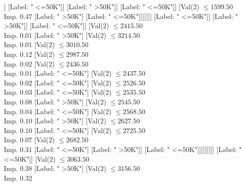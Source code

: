 \documentclass[margin=10pt]{standalone}
\begin{document}
\begin{forest}
																														[Label: " >50K"]]
																													[Label: " <=50K"]]
																												[Label: " >50K"]]
																											[Label: " <=50K"]]
																										[Val($2$) $ \leq 1599.50$ \\ Imp. $0.47$
																											[Label: " >50K"]
																											[Label: " <=50K"]]]]]]]
																					[Label: " <=50K"]]
																				[Label: " >50K"]]
																			[Label: " <=50K"]]
																		[Val($2$) $ \leq 2415.50$ \\ Imp. $0.01$
																			[Label: " >50K"]
																			[Val($2$) $ \leq 3214.50$ \\ Imp. $0.01$
																				[Val($2$) $ \leq 3010.50$ \\ Imp. $0.12$
																					[Val($2$) $ \leq 2987.50$ \\ Imp. $0.02$
																						[Val($2$) $ \leq 2436.50$ \\ Imp. $0.01$
																							[Label: " <=50K"]
																							[Val($2$) $ \leq 2437.50$ \\ Imp. $0.02$
																								[Label: " <=50K"]
																								[Val($2$) $ \leq 2526.50$ \\ Imp. $0.03$
																									[Label: " <=50K"]
																									[Val($2$) $ \leq 2535.50$ \\ Imp. $0.08$
																										[Label: " >50K"]
																										[Val($2$) $ \leq 2545.50$ \\ Imp. $0.04$
																											[Label: " <=50K"]
																											[Val($2$) $ \leq 2568.50$ \\ Imp. $0.10$
																												[Label: " >50K"]
																												[Val($2$) $ \leq 2627.50$ \\ Imp. $0.10$
																													[Label: " <=50K"]
																													[Val($2$) $ \leq 2725.50$ \\ Imp. $0.07$
																														[Val($2$) $ \leq 2682.50$ \\ Imp. $0.31$
																															[Label: " <=50K"]
																															[Label: " >50K"]]
																														[Label: " <=50K"]]]]]]]]]
																						[Label: " <=50K"]]
																					[Val($2$) $ \leq 3063.50$ \\ Imp. $0.38$
																						[Label: " >50K"]
																						[Val($2$) $ \leq 3156.50$ \\ Imp. $0.32$

\end{forest}
\end{document}
